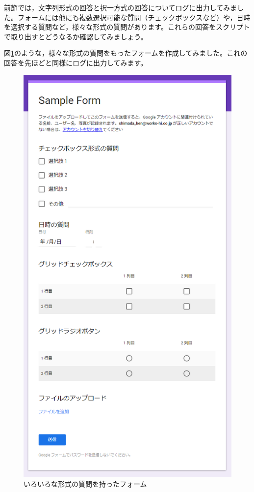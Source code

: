 \documentclass[uplatex,a4j]{jsarticle}
\begin{document}
前節では，文字列形式の回答と択一方式の回答についてログに出力してみました。フォームには他にも複数選択可能な質問（チェックボックスなど）や，日時を選択する質問など，様々な形式の質問があります。これらの回答をスクリプトで取り出すとどうなるか確認してみましょう。

図\ref{fig:various_question}のような，様々な形式の質問をもったフォームを作成してみました。これの回答を先ほどと同様にログに出力してみます。

\begin{figure}[H]
 \centering
 \includegraphics[keepaspectratio, scale=0.5]{images/various_question.png}
 \caption{いろいろな形式の質問を持ったフォーム}
 \label{fig:various_question}
\end{figure}
\end{document}
